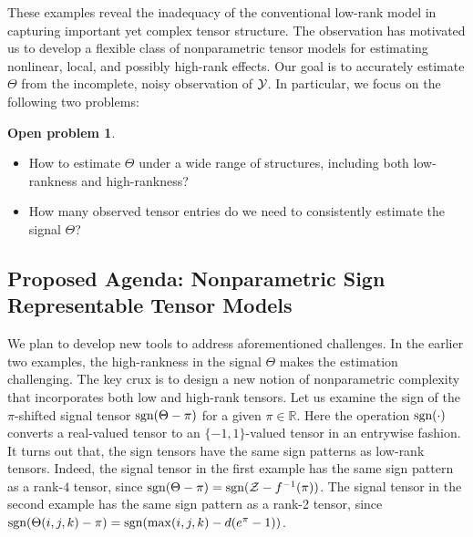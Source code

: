 \documentclass[11pt]{article}
\DeclareRobustCommand{\mybox}[2][gray!20]{%
\begin{tcolorbox}[   %
        breakable,
        left=0pt,
        right=0pt,
        top=0pt,
        bottom=0pt,
        colback=#1,
        colframe=#1,
        width=\dimexpr\textwidth\relax, 
        enlarge left by=0mm,
        boxsep=5pt,
        arc=0pt,outer arc=0pt,
        ]
        #2
\end{tcolorbox}}
\DeclareRobustCommand{\mybox}[2][gray!20]{%
\begin{tcolorbox}[   %
        breakable,
        left=0pt,
        right=0pt,
        top=0pt,
        bottom=0pt,
        colback=#1,
        colframe=#1,
        width=\dimexpr\textwidth\relax, 
        enlarge left by=0mm,
        boxsep=5pt,
        arc=0pt,outer arc=0pt,
        ]
        #2
\end{tcolorbox}
}
\def\sign{\textup{sgn}}
\theoremstyle{exampstyle}
\theoremstyle{definition}
\newtheorem{open}[]{Open problem}
\def\sign{\textup{sgn}}
\begin{document}
These examples reveal the inadequacy of the conventional low-rank model in capturing important yet complex tensor structure. The observation has motivated us to develop a flexible class of nonparametric tensor models for estimating nonlinear, local, and possibly high-rank effects. Our goal is to accurately estimate $\Theta$ from the incomplete, noisy observation of $\mathcal{Y}$. In particular, we focus on the following two problems:
\mybox[gray!20]{
\begin{open}
\begin{itemize}[wide]\hfill
\item How to estimate $\Theta$ under a wide range of structures, including both low-rankness and high-rankness?
\item How many observed tensor entries do we need to consistently estimate the signal $\Theta$?
\end{itemize}
\end{open}
}

  \vspace{-.3cm}
\subsection{Proposed Agenda: Nonparametric Sign Representable Tensor Models}
  \vspace{-.3cm}
We plan to develop new tools to address aforementioned challenges. In the earlier two examples, the high-rankness in the signal $\Theta$ makes the estimation challenging. The key crux is to design a new notion of nonparametric complexity that incorporates both low and high-rank tensors. Let us examine the sign of the $\pi$-shifted signal tensor $\sign(\Theta-\pi)$ for a given $\pi\in\mathbb{R}$. Here the operation $\sign(\cdot)$ converts a real-valued tensor to an $\{-1,1\}$-valued tensor in an entrywise fashion. It turns out that, the sign tensors have the same sign patterns as low-rank tensors. Indeed, the signal tensor in the first example has the same sign pattern as a rank-$4$ tensor, since $\sign(\Theta-\pi)=\sign(\tZ-f^{-1}(\pi))$. The signal tensor in the second example has the same sign pattern as a rank-2 tensor, since $\sign(\Theta(i,j,k)-\pi)=\sign(\max(i,j,k)-d(e^{\pi}-1))$.
\end{document}
